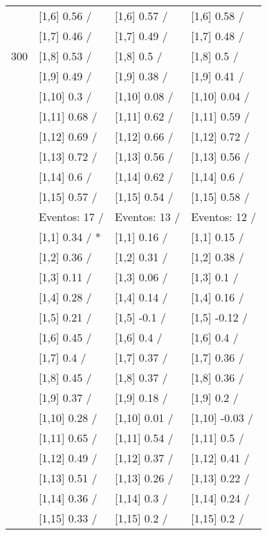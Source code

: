 \begin{table}
\begin{tabular}[t]{llll}
 & {}[1,6] 0.56  / & {}[1,6] 0.57  / & {}[1,6] 0.58  /\\
 & {}[1,7] 0.46  / & {}[1,7] 0.49  / & {}[1,7] 0.48  /\\
300 & {}[1,8] 0.53  / & {}[1,8] 0.5  / & {}[1,8] 0.5  /\\
\addlinespace
 & {}[1,9] 0.49  / & {}[1,9] 0.38  / & {}[1,9] 0.41  /\\
 & {}[1,10] 0.3  / & {}[1,10] 0.08  / & {}[1,10] 0.04  /\\
 & {}[1,11] 0.68  / & {}[1,11] 0.62  / & {}[1,11] 0.59  /\\
 & {}[1,12] 0.69  / & {}[1,12] 0.66  / & {}[1,12] 0.72  /\\
 & {}[1,13] 0.72  / & {}[1,13] 0.56  / & {}[1,13] 0.56  /\\
\addlinespace
 & {}[1,14] 0.6  / & {}[1,14] 0.62  / & {}[1,14] 0.6  /\\
 & {}[1,15] 0.57  / & {}[1,15] 0.54  / & {}[1,15] 0.58  /\\
 & Eventos:  17 / & Eventos:  13 / & Eventos:  12 /\\
 & {}[1,1] 0.34  / * & {}[1,1] 0.16  / & {}[1,1] 0.15  /\\
 & {}[1,2] 0.36  / & {}[1,2] 0.31  / & {}[1,2] 0.38  /\\
\addlinespace
 & {}[1,3] 0.11  / & {}[1,3] 0.06  / & {}[1,3] 0.1  /\\
 & {}[1,4] 0.28  / & {}[1,4] 0.14  / & {}[1,4] 0.16  /\\
 & {}[1,5] 0.21  / & {}[1,5] -0.1  / & {}[1,5] -0.12  /\\
 & {}[1,6] 0.45  / & {}[1,6] 0.4  / & {}[1,6] 0.4  /\\
 & {}[1,7] 0.4  / & {}[1,7] 0.37  / & {}[1,7] 0.36  /\\
\addlinespace
500 & {}[1,8] 0.45  / & {}[1,8] 0.37  / & {}[1,8] 0.36  /\\
 & {}[1,9] 0.37  / & {}[1,9] 0.18  / & {}[1,9] 0.2  /\\
 & {}[1,10] 0.28  / & {}[1,10] 0.01  / & {}[1,10] -0.03  /\\
 & {}[1,11] 0.65  / & {}[1,11] 0.54  / & {}[1,11] 0.5  /\\
 & {}[1,12] 0.49  / & {}[1,12] 0.37  / & {}[1,12] 0.41  /\\
\addlinespace
 & {}[1,13] 0.51  / & {}[1,13] 0.26  / & {}[1,13] 0.22  /\\
 & {}[1,14] 0.36  / & {}[1,14] 0.3  / & {}[1,14] 0.24  /\\
 & {}[1,15] 0.33  / & {}[1,15] 0.2  / & {}[1,15] 0.2  /\\
\bottomrule
\end{tabular}
\end{table}
